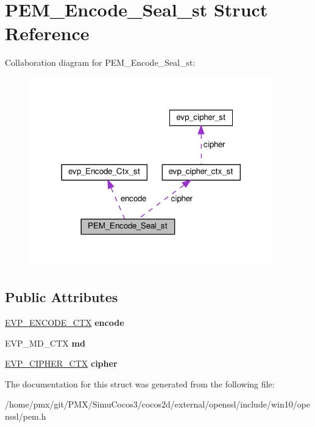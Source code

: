 \hypertarget{structPEM__Encode__Seal__st}{}\section{P\+E\+M\+\_\+\+Encode\+\_\+\+Seal\+\_\+st Struct Reference}
\label{structPEM__Encode__Seal__st}


Collaboration diagram for P\+E\+M\+\_\+\+Encode\+\_\+\+Seal\+\_\+st\+:
\nopagebreak
\begin{figure}[H]
\begin{center}
\leavevmode
\includegraphics[width=300pt]{structPEM__Encode__Seal__st__coll__graph}
\end{center}
\end{figure}
\subsection*{Public Attributes}
\begin{DoxyCompactItemize}
\item 
\mbox{\label{structPEM__Encode__Seal__st_a47cfc43decced4ead8d4939f37ff5d32}} 
\hyperlink{structevp__Encode__Ctx__st}{E\+V\+P\+\_\+\+E\+N\+C\+O\+D\+E\+\_\+\+C\+TX} {\bfseries encode}
\item 
\mbox{\label{structPEM__Encode__Seal__st_abdc58bdc153bb43dcf29e7a6a339f8bd}} 
E\+V\+P\+\_\+\+M\+D\+\_\+\+C\+TX {\bfseries md}
\item 
\mbox{\label{structPEM__Encode__Seal__st_a5a3c09ebd5be8036df38f8f623f5ef79}} 
\hyperlink{structevp__cipher__ctx__st}{E\+V\+P\+\_\+\+C\+I\+P\+H\+E\+R\+\_\+\+C\+TX} {\bfseries cipher}
\end{DoxyCompactItemize}


The documentation for this struct was generated from the following file\+:\begin{DoxyCompactItemize}
\item 
/home/pmx/git/\+P\+M\+X/\+Simu\+Cocos3/cocos2d/external/openssl/include/win10/openssl/pem.\+h\end{DoxyCompactItemize}
